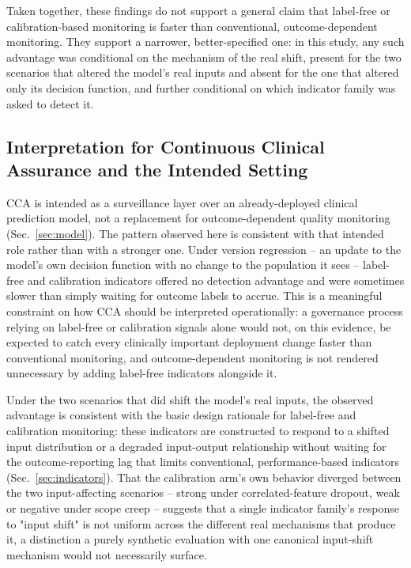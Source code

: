 \documentclass[preprintsapa,article,submit,oneauthor]{Definitions/mdpi}
\begin{document}
Taken together, these findings do not support a general claim that label-free or calibration-based monitoring is faster than conventional, outcome-dependent monitoring. They support a narrower, better-specified one: in this study, any such advantage was conditional on the mechanism of the real shift, present for the two scenarios that altered the model's real inputs and absent for the one that altered only its decision function, and further conditional on which indicator family was asked to detect it.

\subsection{Interpretation for Continuous Clinical Assurance and the Intended Setting}\label{sec:disc-interpretation}

CCA is intended as a surveillance layer over an already-deployed clinical prediction model, not a replacement for outcome-dependent quality monitoring (Sec.~\ref{sec:model}). The pattern observed here is consistent with that intended role rather than with a stronger one. Under version regression -- an update to the model's own decision function with no change to the population it sees -- label-free and calibration indicators offered no detection advantage and were sometimes slower than simply waiting for outcome labels to accrue. This is a meaningful constraint on how CCA should be interpreted operationally: a governance process relying on label-free or calibration signals alone would not, on this evidence, be expected to catch every clinically important deployment change faster than conventional monitoring, and outcome-dependent monitoring is not rendered unnecessary by adding label-free indicators alongside it.

Under the two scenarios that did shift the model's real inputs, the observed advantage is consistent with the basic design rationale for label-free and calibration monitoring: these indicators are constructed to respond to a shifted input distribution or a degraded input-output relationship without waiting for the outcome-reporting lag that limits conventional, performance-based indicators (Sec.~\ref{sec:indicators}). That the calibration arm's own behavior diverged between the two input-affecting scenarios -- strong under correlated-feature dropout, weak or negative under scope creep -- suggests that a single indicator family's response to "input shift" is not uniform across the different real mechanisms that produce it, a distinction a purely synthetic evaluation with one canonical input-shift mechanism would not necessarily surface.
\end{document}

